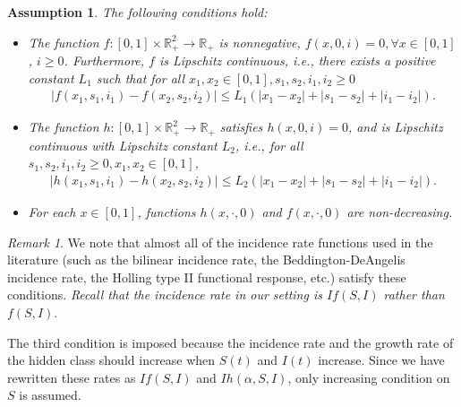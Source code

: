 \documentclass[12pt]{amsart}
\newtheorem {asp}{Assumption}[section]
\theoremstyle{remark}
\newtheorem{rem}{Remark}
\numberwithin{equation}{section}
\newcommand{\R}{\mathbb{R}}
\newcommand{\abs}[1]{\left\vert#1\right\vert}
\numberwithin{equation}{section}
\newcommand{\1}{\boldsymbol{1}}
\def\bar{\overline}
\begin{document}
\begin{asp}\label{asp-1}
	The following conditions hold:
	\begin{itemize}
		\item The function $f:[0,1]\times \R^2_+\to\R_+$ is nonnegative, $f(x,0,i)=0, \forall x\in[0,1]$, $i\geq 0$. Furthermore, $f$ is Lipschitz continuous,
		i.e., there exists a positive constant $L_1$ such that
		 for all $ x_1,x_2\in[0,1], s_1,s_2,i_1,i_2\geq 0$
		\begin{equation*}
		\begin{aligned}\abs{f(x_1,s_1,i_1)-f(x_2,s_2,i_2)}\leq L_1(|x_1-x_2|+\abs{s_1-s_2}+\abs{i_1-i_2}).
		\end{aligned}
		\end{equation*}
		\item The function $h:[0,1]\times\R_+^2\to\R_+$ satisfies $h(x,0,i)=0$, and is Lipschitz continuous with Lipschitz constant $L_2$, i.e., for all $s_1,s_2,i_1,i_2\geq 0, x_1,x_2\in[0,1]$,
				\begin{equation*}
		\begin{aligned}\abs{h(x_1,s_1,i_1)-h(x_2,s_2,i_2)}\leq L_2(|x_1-x_2|+\abs{s_1-s_2}+\abs{i_1-i_2}).
		\end{aligned}
		\end{equation*}
	\item For each $x\in[0,1]$, functions $h(x,\cdot,0)$ and $f(x,\cdot,0)$ are non-decreasing.
	\end{itemize}
\end{asp}

\begin{rem}
We note that almost all of the incidence rate functions used in the literature (such as the bilinear incidence rate, the Beddington-DeAngelis incidence rate, the Holling type II functional response, etc.) satisfy these conditions. \textit{Recall that the incidence rate in our setting is $If(S,I)$ rather than $f(S,I)$}.

The third condition is imposed because the incidence rate and the growth rate of the hidden class should increase when $S(t)$ and $I(t)$ increase. Since we have rewritten these rates as $If(S,I)$ and $Ih(\alpha,S,I)$, only increasing condition on $S$ is assumed.
\end{rem}
\end{document}

